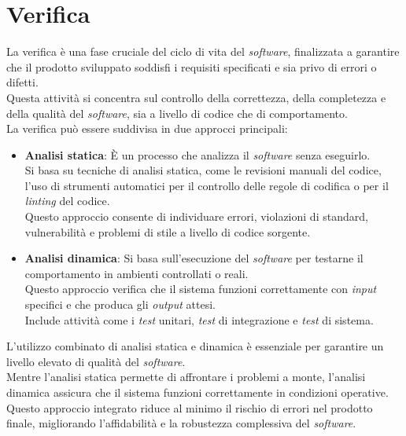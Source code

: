 \pagebreak
\section{Verifica}
\label{sez:verifica}

La verifica è una fase cruciale del ciclo di vita del \textit{software}, finalizzata a garantire che il prodotto sviluppato soddisfi i requisiti specificati e sia privo di errori o difetti.\\
Questa attività si concentra sul controllo della correttezza, della completezza e della qualità del \textit{software}, sia a livello di codice che di comportamento.\\

\noindent La verifica può essere suddivisa in due approcci principali:

\begin{itemize}
\item \textbf{Analisi statica}:
È un processo che analizza il \textit{software} senza eseguirlo. \\
Si basa su tecniche di analisi statica, come le revisioni manuali del codice, l'uso di strumenti automatici per il controllo delle regole di codifica o per il \textit{linting} del codice. \\
Questo approccio consente di individuare errori, violazioni di standard, vulnerabilità e problemi di stile a livello di codice sorgente.  

\item \textbf{Analisi dinamica}:
Si basa sull’esecuzione del \textit{software} per testarne il comportamento in ambienti controllati o reali.\\
Questo approccio verifica che il sistema funzioni correttamente con \textit{input} specifici e che produca gli \textit{output} attesi. \\
Include attività come i \textit{test} unitari, \textit{test} di integrazione e \textit{test} di sistema.  
\end{itemize}

\noindent L’utilizzo combinato di analisi statica e dinamica è essenziale per garantire un livello elevato di qualità del \textit{software}. \\
Mentre l'analisi statica permette di affrontare i problemi a monte, l'analisi dinamica assicura che il sistema funzioni correttamente in condizioni operative. \\
Questo approccio integrato riduce al minimo il rischio di errori nel prodotto finale, migliorando l'affidabilità e la robustezza complessiva del \textit{software}.

